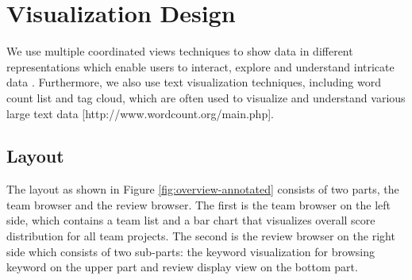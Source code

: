 \documentclass{sigchi}
\begin{document}
\section{Visualization Design}
We use multiple coordinated views techniques to show data in different representations which enable users to interact, explore and understand intricate data \cite{roberts2007state}. Furthermore, we also use text visualization techniques, including word count list and tag cloud, which are often used to visualize and understand various large text data \cite{kuo2007tag} [http://www.wordcount.org/main.php].

\subsection{Layout}
The layout as shown in Figure \ref{fig:overview-annotated} consists of two
parts, the team browser and the review browser.  The first is the team browser
on the left side, which contains a team list and a bar chart that visualizes
overall score distribution for all team projects. The second is the review
browser on the right side which consists of two sub-parts: the keyword
visualization for browsing keyword on the upper part and review display view on
the bottom part.
\end{document}
